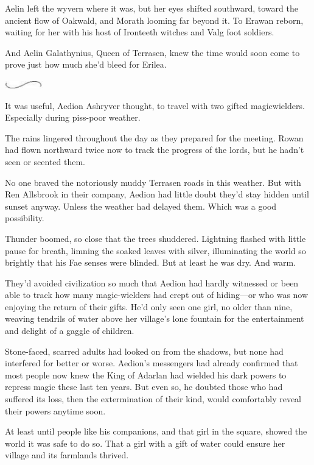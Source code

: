 Aelin left the wyvern where it was, but her eyes shifted southward, toward the ancient flow of Oakwald, and Morath looming far beyond it. To Erawan reborn, waiting for her with his host of Ironteeth witches and Valg foot soldiers.

And Aelin Galathynius, Queen of Terrasen, knew the time would soon come to prove just how much she'd bleed for Erilea.

\includegraphics[width=0.65in,height=0.13in]{images/seperator}

It was useful, Aedion Ashryver thought, to travel with two gifted magicwielders. Especially during piss-poor weather.

The rains lingered throughout the day as they prepared for the meeting. Rowan had flown northward twice now to track the progress of the lords, but he hadn't seen or scented them.

No one braved the notoriously muddy Terrasen roads in this weather. But with Ren Allsbrook in their company, Aedion had little doubt they'd stay hidden until sunset anyway. Unless the weather had delayed them. Which was a good possibility.

Thunder boomed, so close that the trees shuddered. Lightning flashed with little pause for breath, limning the soaked leaves with silver, illuminating the world so brightly that his Fae senses were blinded. But at least he was dry. And warm.

They'd avoided civilization so much that Aedion had hardly witnessed or been able to track how many magic-wielders had crept out of hiding---or who was now enjoying the return of their gifts. He'd only seen one girl, no older than nine, weaving tendrils of water above her village's lone fountain for the entertainment and delight of a gaggle of children.

Stone-faced, scarred adults had looked on from the shadows, but none had interfered for better or worse. Aedion's messengers had already confirmed that most people now knew the King of Adarlan had wielded his dark powers to repress magic these last ten years. But even so, he doubted those who had suffered its loss, then the extermination of their kind, would comfortably reveal their powers anytime soon.

At least until people like his companions, and that girl in the square, showed the world it was safe to do so. That a girl with a gift of water could ensure her village and its farmlands thrived.

